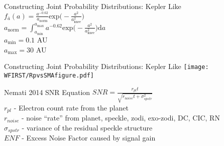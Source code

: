\documentclass[aspectratio=169]{beamer}
\begin{document}
\appendix




\begin{frame}{}
    
\end{frame}

\begin{frame}{Constructing Joint Probability Distributions: Kepler Like}
$f_{\bar{a}} (a) = \frac{a^{-0.62}}{a_\mathrm{norm}} \mathrm{exp} \Big( -\frac{a^2}{a_\mathrm{knee}^2} \Big)$\\
$a_{\mathrm{norm}} = \int_{a_\mathrm{min}}^{a_\mathrm{max}} a^{-0.62} \mathrm{exp} \Big( -\frac{a^2}{a_\mathrm{knee}^2} \Big) \mathrm{d}a$\\
$a_{\mathrm{min}} = 0.1$ AU\\
$a_{\mathrm{max}} = 30$ AU\\
\end{frame}

\begin{frame}{Constructing Joint Probability Distributions: Kepler Like}
\texttt{[image: WFIRST/RpvsSMAfigure.pdf]}
\end{frame}


\begin{frame}{Nemati 2014 SNR Equation}
$\displaystyle SNR=\frac{r_{pl}t}{\sqrt{r_{noise}t+\sigma^2_{spstr}}}$\\
$r_{pl}$ - Electron count rate from the planet\\
$r_{noise}$ - noise ``rate'' from planet, speckle, zodi, exo-zodi, DC, CIC, RN\\
$\sigma_{spstr}$ - variance of the residual speckle structure\\
$ENF$ - Excess Noise Factor caused by signal gain
\end{frame}
\end{document}
